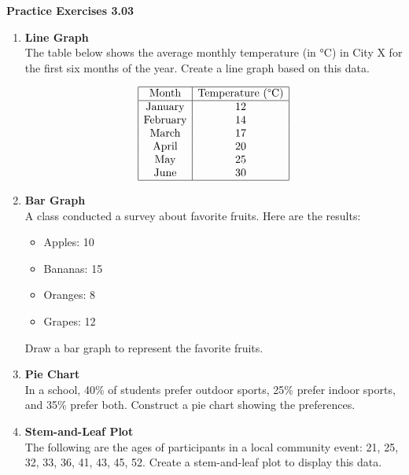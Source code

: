 \vspace{0.3ex}
\noindent\textbf{Practice Exercises 3.03}

\vspace{0.2ex}


\begin{enumerate}[label=\color{blue}\arabic*. , noitemsep]
    \item \textbf{Line Graph} \\
    The table below shows the average monthly temperature (in °C) in City X for the first six months of the year. Create a line graph based on this data.
    
    \[
    \begin{array}{|c|c|}
    \hline
    \text{Month} & \text{Temperature (°C)} \\
    \hline
    \text{January} & 12 \\
    \text{February} & 14 \\
    \text{March} & 17 \\
    \text{April} & 20 \\
    \text{May} & 25 \\
    \text{June} & 30 \\
    \hline
    \end{array}
    \]

    \item \textbf{Bar Graph} \\
    A class conducted a survey about favorite fruits. Here are the results:
    \begin{itemize}
        \item Apples: 10
        \item Bananas: 15
        \item Oranges: 8
        \item Grapes: 12
    \end{itemize}
    Draw a bar graph to represent the favorite fruits.

    \item \textbf{Pie Chart} \\
    In a school, 40\% of students prefer outdoor sports, 25\% prefer indoor sports, and 35\% prefer both. Construct a pie chart showing the preferences.

    \item \textbf{Stem-and-Leaf Plot} \\
    The following are the ages of participants in a local community event: 21, 25, 32, 33, 36, 41, 43, 45, 52.  
    Create a stem-and-leaf plot to display this data.


\end{enumerate}
